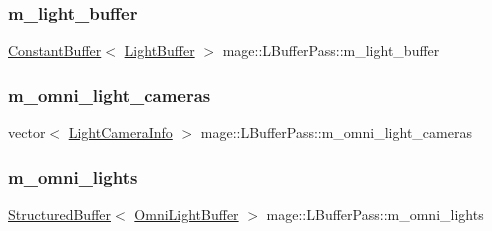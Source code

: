\hypertarget{structmage_1_1_l_buffer_pass_a5946e3e691734567824644f8d1ec77b9}{}\label{structmage_1_1_l_buffer_pass_a5946e3e691734567824644f8d1ec77b9} 
\subsubsection{\texorpdfstring{m\+\_\+light\+\_\+buffer}{m\_light\_buffer}}
{\footnotesize\ttfamily \hyperlink{structmage_1_1_constant_buffer}{Constant\+Buffer}$<$ \hyperlink{structmage_1_1_light_buffer}{Light\+Buffer} $>$ mage\+::\+L\+Buffer\+Pass\+::m\+\_\+light\+\_\+buffer\hspace{0.3cm}{\ttfamily [private]}}

\hypertarget{structmage_1_1_l_buffer_pass_ab5c839ec3dca33bde5c94d195892120e}{}\label{structmage_1_1_l_buffer_pass_ab5c839ec3dca33bde5c94d195892120e} 
\subsubsection{\texorpdfstring{m\+\_\+omni\+\_\+light\+\_\+cameras}{m\_omni\_light\_cameras}}
{\footnotesize\ttfamily vector$<$ \hyperlink{structmage_1_1_light_camera_info}{Light\+Camera\+Info} $>$ mage\+::\+L\+Buffer\+Pass\+::m\+\_\+omni\+\_\+light\+\_\+cameras\hspace{0.3cm}{\ttfamily [private]}}

\hypertarget{structmage_1_1_l_buffer_pass_afc2754b9d3a3b1c2171cd1a6e5b2349d}{}\label{structmage_1_1_l_buffer_pass_afc2754b9d3a3b1c2171cd1a6e5b2349d} 
\subsubsection{\texorpdfstring{m\+\_\+omni\+\_\+lights}{m\_omni\_lights}}
{\footnotesize\ttfamily \hyperlink{structmage_1_1_structured_buffer}{Structured\+Buffer}$<$ \hyperlink{structmage_1_1_omni_light_buffer}{Omni\+Light\+Buffer} $>$ mage\+::\+L\+Buffer\+Pass\+::m\+\_\+omni\+\_\+lights\hspace{0.3cm}{\ttfamily [private]}}

